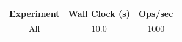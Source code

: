 \begin{tabular}{ccc}
\hline
Experiment & Wall Clock (s) & Ops/sec \\
\hline
All & 10.0 & 1000 \\
\hline
\end{tabular}
